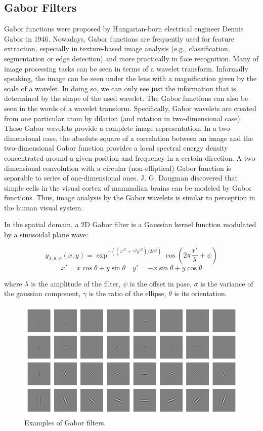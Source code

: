\subsection{Gabor Filters}
\label{Gabor}
Gabor functions were proposed by Hungarian-born electrical engineer Dennis Gabor in 1946. Nowadays, Gabor functions are frequently used for feature extraction, especially in texture-based image analysis (e.g., classification, segmentation or edge detection) and more practically in face recognition. Many of image processing tasks can be seen in terms of a wavelet transform. Informally speaking, the image can be seen under the lens with a magnification given by the scale of a wavelet. In doing so, 
we can only see just the information that is determined by the shape of the used wavelet. The Gabor functions can also be seen in the words of a wavelet transform. Specifically, Gabor wavelets are created from one particular atom by dilation (and rotation in two-dimensional case). These Gabor wavelets provide a complete image representation. In a two-dimensional case, the absolute square of a correlation between an image and the two-dimensional Gabor function provides a local spectral energy density concentrated around a given position and frequency in a certain direction. A two-dimensional convolution with a circular (non-elliptical) Gabor
function is separable to series of one-dimensional ones. J. G. Daugman discovered that simple cells
in the visual cortex of mammalian brains can be modeled by Gabor functions. Thus, image analysis
by the Gabor wavelets is similar to perception in the human visual system.

In the spatial domain, a 2D Gabor filter is a Gaussian kernel function modulated by a sinusoidal plane wave:

\begin{equation}
g_{\lambda, \theta, \psi}(x,y) = \exp^{-((x'^2+\gamma^2y'^2)/2\sigma^2)} \cos \left(2\pi \frac{x'}{\lambda}+\psi \right)
\end{equation}
$$ x' = x \cos \theta + y \sin \theta \quad y'=-x\sin\theta +y\cos\theta $$

where $\lambda$ is the amplitude of the filter, $\psi$ is the offset in pase, $\sigma$ is the variance of the gaussian component, $\gamma$ is the ratio of the ellipse, $\theta$ is its orientation.
\begin{figure}[htbp]
	\centering
		\includegraphics[width=\linewidth]{Figures/gabor.png}
	\caption{Examples of Gabor filters.}
	\label{fig:Gabor}
\end{figure}

